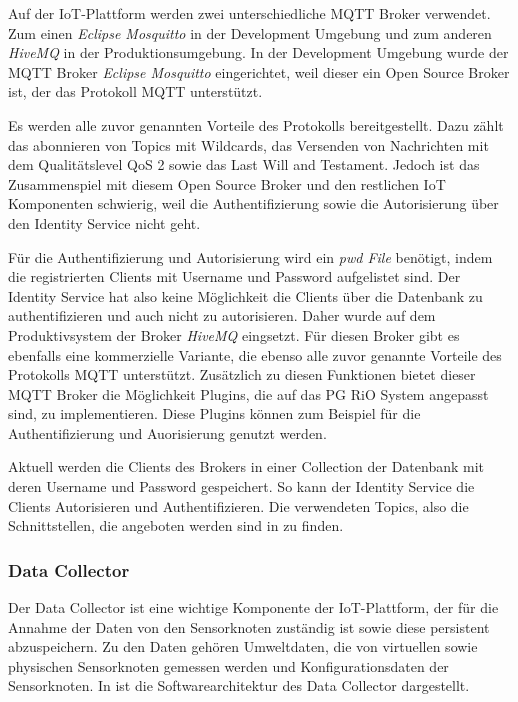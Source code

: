 Auf der IoT-Plattform werden zwei unterschiedliche MQTT Broker verwendet.
Zum einen \textit{Eclipse Mosquitto} in der Development Umgebung und zum anderen \textit{HiveMQ} in der Produktionsumgebung.
In der Development Umgebung wurde der MQTT Broker \textit{Eclipse Mosquitto} eingerichtet, weil dieser ein Open Source Broker ist, der das Protokoll MQTT unterstützt.


Es werden alle zuvor genannten Vorteile des Protokolls bereitgestellt.
Dazu zählt das abonnieren von Topics mit Wildcards, das Versenden von Nachrichten mit dem Qualitätslevel QoS 2 sowie das Last Will and Testament.
Jedoch ist das Zusammenspiel mit diesem Open Source Broker und den restlichen IoT Komponenten schwierig, weil die Authentifizierung sowie die Autorisierung über den Identity Service nicht geht.


Für die Authentifizierung und Autorisierung wird ein \textit{pwd File} benötigt, indem die registrierten Clients mit Username und Password aufgelistet sind.
Der Identity Service hat also keine Möglichkeit die Clients über die Datenbank zu authentifizieren und auch nicht zu autorisieren\cite{eclipse}.
Daher wurde auf dem Produktivsystem der Broker \textit{HiveMQ} eingsetzt.
Für diesen Broker gibt es ebenfalls eine kommerzielle Variante, die ebenso alle zuvor genannte Vorteile des Protokolls MQTT unterstützt.
Zusätzlich zu diesen Funktionen bietet dieser MQTT Broker die Möglichkeit Plugins, die auf das PG RiO System angepasst sind, zu implementieren.
Diese Plugins können zum Beispiel für die Authentifizierung und Auorisierung genutzt werden.


Aktuell werden die Clients des Brokers in einer Collection der Datenbank mit deren Username und Password gespeichert\cite{hivemq}.
So kann der Identity Service die Clients Autorisieren und Authentifizieren.
Die verwendeten Topics, also die Schnittstellen, die angeboten werden sind in  zu finden.

\subsubsection{Data Collector}
\label{sec:arch:iot:dc}
Der Data Collector ist eine wichtige Komponente der IoT-Plattform, der für die Annahme der Daten von den Sensorknoten zuständig ist sowie diese persistent abzuspeichern.
Zu den Daten gehören Umweltdaten, die von virtuellen sowie physischen Sensorknoten gemessen werden und Konfigurationsdaten der Sensorknoten.
In  ist die Softwarearchitektur des Data Collector dargestellt. 


